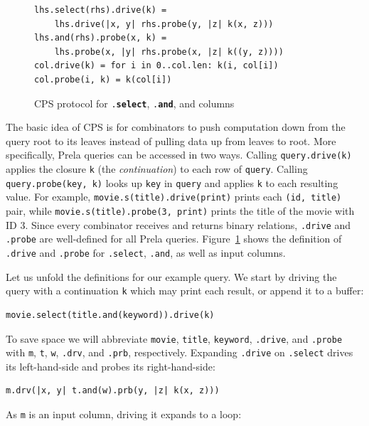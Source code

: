 \documentclass[sigconf,screen,pbalance]{cidr-2027}
\newcommand{\pkw}[1]{\textcolor{CodeFunction}{\textbf{#1}}}
\newcommand{\code}{\lstinline[style=prela]}
\begin{document}
\begin{figure}
\begin{lstlisting}
lhs.select(rhs).drive(k) =
    lhs.drive(|x, y| rhs.probe(y, |z| k(x, z)))
lhs.and(rhs).probe(x, k) =
    lhs.probe(x, |y| rhs.probe(x, |z| k((y, z))))
col.drive(k) = for i in 0..col.len: k(i, col[i])
col.probe(i, k) = k(col[i])
\end{lstlisting}
\caption{CPS protocol for \texttt{.\pkw{select}}, \texttt{.\pkw{and}}, and columns}
\label{fig-cps}
\end{figure}

The basic idea of CPS is for combinators to push computation down from the query root to its leaves instead of pulling data up from leaves to root.
More specifically, Prela queries can be accessed in two ways.
Calling \code|query.drive(k)| applies the closure \code|k| (the \emph{continuation}) to each row of \code|query|.
Calling \code|query.probe(key, k)| looks up \code|key| in \code|query| and applies \code|k| to each resulting value.
For example, \code|movie.s(title).drive(print)| prints each \code|(id, title)| pair, while \code|movie.s(title).probe(3, print)| prints the title of the movie with ID 3.
Since every combinator receives and returns binary relations, \code|.drive| and \code|.probe| are well-defined for all Prela queries.
Figure~\ref{fig-cps} shows the definition of \code|.drive| and \code|.probe| for \code|.select|, \code|.and|, as well as input columns.

Let us unfold the definitions for our example query.
We start by driving the query with a continuation \code|k| which may print each result, or append it to a buffer:

\begin{lstlisting}
movie.select(title.and(keyword)).drive(k)
\end{lstlisting}

To save space we will abbreviate \code|movie|, \code|title|, \code|keyword|, \code|.drive|, and \code|.probe| with \code|m|, \code|t|, \code|w|, \code|.drv|, and \code|.prb|, respectively.
Expanding \code|.drive| on \code|.select| drives its left-hand-side and probes its right-hand-side:

\begin{lstlisting}
m.drv(|x, y| t.and(w).prb(y, |z| k(x, z)))
\end{lstlisting}

As \code|m| is an input column, driving it expands to a loop:
\end{document}
